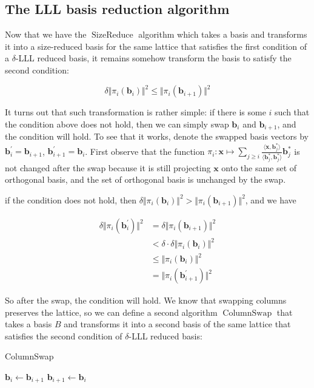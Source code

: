 \documentclass[letterpaper,12pt]{article}
\begin{document}
\subsection{The LLL basis reduction algorithm}
Now that we have the $\operatorname{SizeReduce}$ algorithm which takes a basis and transforms it into a size-reduced basis for the same lattice that satisfies the first condition of a $\delta$-LLL reduced basis, it remains somehow transform the basis to satisfy the second condition:

$$
\delta \Vert \pi_i(\mathbf{b}_i) \Vert^2 \leq \Vert \pi_i(\mathbf{b}_{i+1})\Vert^2
$$

It turns out that such transformation is rather simple: if there is some $i$ such that the condition above does not hold, then we can simply swap $\mathbf{b}_i$ and $\mathbf{b}_{i+1}$, and the condition will hold. To see that it works, denote the swapped basis vectors by $\mathbf{b}_i^\prime = \mathbf{b}_{i+1}$, $\mathbf{b}_{i+1}^\prime = \mathbf{b}_{i}$. First observe that the function $\pi_i: \mathbf{x} \mapsto \sum_{j\geq i}\frac{\langle \mathbf{x}, \mathbf{b}_j^\ast \rangle}{\langle \mathbf{b}_j^\ast, \mathbf{b}_j^\ast \rangle}\mathbf{b}_j^\ast$ is not changed after the swap because it is still projecting $\mathbf{x}$ onto the same set of orthogonal basis, and the set of orthogonal basis is unchanged by the swap.

if the condition does not hold, then $\delta\Vert\pi_i(\mathbf{b}_i)\Vert^2 > \Vert\pi_i(\mathbf{b}_{i+1})\Vert^2$, and we have

$$
\begin{aligned}
\delta \Vert\pi_i(\mathbf{b}_i^\prime)\Vert^2
&= \delta \Vert\pi_i(\mathbf{b}_{i+1})\Vert^2 \\
&< \delta \cdot \delta\Vert\pi_i(\mathbf{b}_i)\Vert^2 \\
&\leq \Vert\pi_i(\mathbf{b}_i)\Vert^2 \\
&= \Vert\pi_i(\mathbf{b}_{i+1}^\prime)\Vert^2
\end{aligned}
$$

So after the swap, the condition will hold. We know that swapping columns preserves the lattice, so we can define a second algorithm $\operatorname{ColumnSwap}$ that takes a basis $B$ and transforms it into a second basis of the same lattice that satisfies the second condition of $\delta$-LLL reduced basis:

\begin{algorithm}
\caption{ColumnSwap}
\begin{algorithmic}[1]
            \State $\mathbf{b}_i \leftarrow \mathbf{b}_{i+1}$
            \State $\mathbf{b}_{i+1} \leftarrow \mathbf{b}_{i}$
        \EndIf
    \EndFor
\end{algorithmic}
\end{algorithm}
\end{document}
